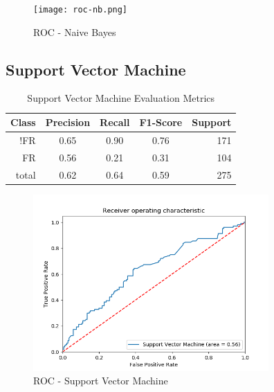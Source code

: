 \documentclass{article}
\begin{document}
\begin{figure}[h]
\texttt{[image: roc-nb.png]}
\caption{ROC - Naive Bayes}\label{fig:nb}
\centering
\end{figure}
\subsection{Support Vector Machine}
\begin{table}[!htb]
\setlength\tabcolsep{0pt} %
\footnotesize\centering
\smallskip 
\begin{tabular*}{\columnwidth}{@{\extracolsep{\fill}}rcccr}
\toprule
  Class&Precision&Recall&F1-Score&Support \\
\midrule
  !FR  & 0.65&0.90&0.76&171\\
  FR & 0.56&0.21&0.31&104 \\
  \midrule
total&0.62&0.64&0.59&275\\
\bottomrule
\end{tabular*}
\caption{Support Vector Machine Evaluation Metrics} \label{tab:svm}
\end{table}

\begin{figure}[h]
\includegraphics[width=9cm]{images/roc-svm.png}
\caption{ROC - Support Vector Machine}\label{fig:svm}
\centering
\end{figure}



\end{document}
